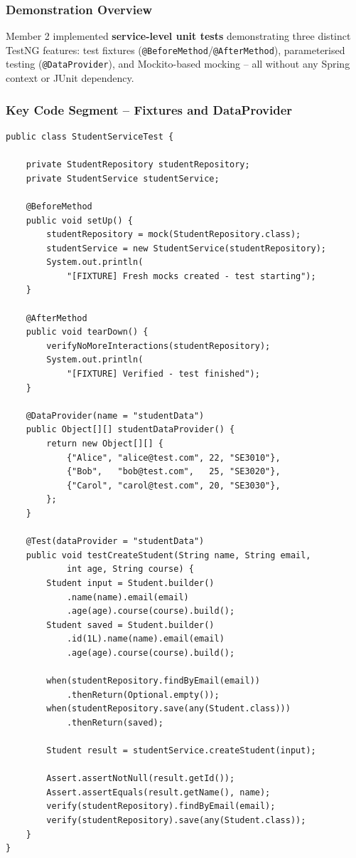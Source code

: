 \documentclass[12pt,a4paper]{article}
\begin{document}
\subsubsection{Demonstration Overview}

Member 2 implemented \textbf{service-level unit tests} demonstrating three distinct TestNG features: test fixtures (\texttt{@BeforeMethod}/\texttt{@AfterMethod}), parameterised testing (\texttt{@DataProvider}), and Mockito-based mocking -- all without any Spring context or JUnit dependency.

\subsubsection{Key Code Segment -- Fixtures and DataProvider}

\begin{lstlisting}[style=javastyle, caption={TestNG fixtures and DataProvider for parameterised testing}]
public class StudentServiceTest {

    private StudentRepository studentRepository;
    private StudentService studentService;

    @BeforeMethod
    public void setUp() {
        studentRepository = mock(StudentRepository.class);
        studentService = new StudentService(studentRepository);
        System.out.println(
            "[FIXTURE] Fresh mocks created - test starting");
    }

    @AfterMethod
    public void tearDown() {
        verifyNoMoreInteractions(studentRepository);
        System.out.println(
            "[FIXTURE] Verified - test finished");
    }

    @DataProvider(name = "studentData")
    public Object[][] studentDataProvider() {
        return new Object[][] {
            {"Alice", "alice@test.com", 22, "SE3010"},
            {"Bob",   "bob@test.com",   25, "SE3020"},
            {"Carol", "carol@test.com", 20, "SE3030"},
        };
    }

    @Test(dataProvider = "studentData")
    public void testCreateStudent(String name, String email,
            int age, String course) {
        Student input = Student.builder()
            .name(name).email(email)
            .age(age).course(course).build();
        Student saved = Student.builder()
            .id(1L).name(name).email(email)
            .age(age).course(course).build();

        when(studentRepository.findByEmail(email))
            .thenReturn(Optional.empty());
        when(studentRepository.save(any(Student.class)))
            .thenReturn(saved);

        Student result = studentService.createStudent(input);

        Assert.assertNotNull(result.getId());
        Assert.assertEquals(result.getName(), name);
        verify(studentRepository).findByEmail(email);
        verify(studentRepository).save(any(Student.class));
    }
}
\end{lstlisting}
\end{document}
